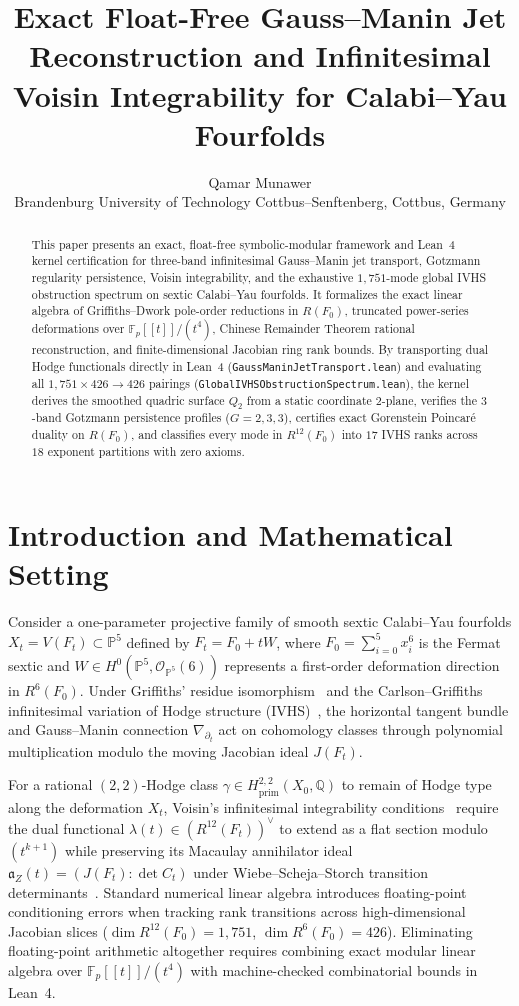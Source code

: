 \documentclass[11pt,a4paper]{article}
\title{\textbf{Exact Float-Free Gauss--Manin Jet Reconstruction and Infinitesimal Voisin Integrability for Calabi--Yau Fourfolds}}
\author{
  Qamar Munawer\\
  \small Brandenburg University of Technology Cottbus--Senftenberg, Cottbus, Germany
}
\date{}
\begin{document}
\maketitle

\begin{abstract}
This paper presents an exact, float-free symbolic-modular framework and Lean~4 kernel certification for three-band infinitesimal Gauss--Manin jet transport, Gotzmann regularity persistence, Voisin integrability, and the exhaustive $1{,}751$-mode global IVHS obstruction spectrum on sextic Calabi--Yau fourfolds. It formalizes the exact linear algebra of Griffiths--Dwork pole-order reductions in $R(F_0)$, truncated power-series deformations over $\mathbb{F}_p[[t]]/(t^4)$, Chinese Remainder Theorem rational reconstruction, and finite-dimensional Jacobian ring rank bounds. By transporting dual Hodge functionals directly in Lean~4 (\texttt{GaussManinJetTransport.lean}) and evaluating all $1{,}751 \times 426 \to 426$ pairings (\texttt{GlobalIVHSObstructionSpectrum.lean}), the kernel derives the smoothed quadric surface $Q_2$ from a static coordinate $2$-plane, verifies the $3$-band Gotzmann persistence profiles ($G=2,3,3$), certifies exact Gorenstein Poincar\'e duality on $R(F_0)$, and classifies every mode in $R^{12}(F_0)$ into $17$ IVHS ranks across $18$ exponent partitions with zero axioms.
\end{abstract}

\section{Introduction and Mathematical Setting}

Consider a one-parameter projective family of smooth sextic Calabi--Yau fourfolds $X_t = V(F_t) \subset \mathbb{P}^5$ defined by $F_t = F_0 + t W$, where $F_0 = \sum_{i=0}^5 x_i^6$ is the Fermat sextic and $W \in H^0(\mathbb{P}^5, \mathcal{O}_{\mathbb{P}^5}(6))$ represents a first-order deformation direction in $R^6(F_0)$. Under Griffiths' residue isomorphism~\cite{Griffiths1969} and the Carlson--Griffiths infinitesimal variation of Hodge structure (IVHS)~\cite{CarlsonGriffiths1980}, the horizontal tangent bundle and Gauss--Manin connection $\nabla_{\partial_t}$ act on cohomology classes through polynomial multiplication modulo the moving Jacobian ideal $J(F_t)$.

For a rational $(2,2)$-Hodge class $\gamma \in H^{2,2}_{\mathrm{prim}}(X_0, \mathbb{Q})$ to remain of Hodge type along the deformation $X_t$, Voisin's infinitesimal integrability conditions~\cite{Voisin2002} require the dual functional $\lambda(t) \in (R^{12}(F_t))^\vee$ to extend as a flat section modulo $(t^{k+1})$ while preserving its Macaulay annihilator ideal $\mathfrak{a}_Z(t) = (J(F_t) : \det C_t)$ under Wiebe--Scheja--Storch transition determinants~\cite{SchejaStorch1975}. Standard numerical linear algebra introduces floating-point conditioning errors when tracking rank transitions across high-dimensional Jacobian slices ($\dim R^{12}(F_0) = 1{,}751$, $\dim R^6(F_0) = 426$). Eliminating floating-point arithmetic altogether requires combining exact modular linear algebra over $\mathbb{F}_p[[t]]/(t^4)$ with machine-checked combinatorial bounds in Lean~4.
\end{document}
